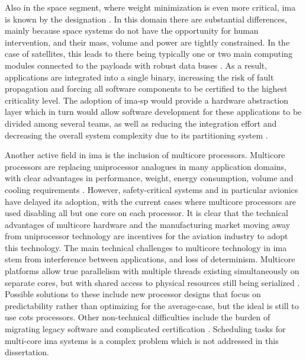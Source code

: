 \documentclass[main.tex]{subfiles}
\begin{document}
Also in the space segment, where weight minimization is even more critical, \gls{ima} is known by the designation .
In this domain there are substantial differences, mainly because space systems do not have the opportunity for human intervention, and their mass, volume and power are tightly constrained.
In the case of satellites, this leads to there being typically one or two main computing modules connected to the payloads with robust data buses \cite{silva2012integrated}.
As a result, applications are integrated into a single binary, increasing the risk of fault propagation and forcing all software components to be certified to the highest criticality level.
The adoption of \gls{ima-sp} would provide a hardware abstraction layer which in turn would allow software development for these applications to be divided among several teams, as well as reducing the integration effort and decreasing the overall system complexity due to its partitioning system \cite{windsor2011integrated}.

Another active field in \gls{ima} is the inclusion of multicore processors.
Multicore processors are replacing uniprocessor analogues in many application domains, with clear advantages in performance, weight, energy consumption, volume and cooling requirements \cite{melani2017scheduling}.
However, safety-critical systems and in particular avionics have delayed its adoption, with the current cases where multicore processors are used disabling all but one core on each processor. %
It is clear that the technical advantages of multicore hardware and the manufacturing market moving away from uniprocessor technology are incentives for the aviation industry to adopt this technology.
The main technical challenges to multicore technology in \gls{ima} stem from interference between applications, and loss of determinism. 
Multicore platforms allow true parallelism with multiple threads existing simultaneously on separate cores, but with shared access to physical resources still being serialized \cite{silva2014multima}.
Possible solutions to these include new processor designs that focus on predictability rather than optimizing for the average-case, but the ideal is still to use \gls{cots} processors.
Other non-technical difficulties include the burden of migrating legacy software and complicated certification \cite{melani2017scheduling}.
Scheduling tasks for multi-core \gls{ima} systems is a complex problem which is not addressed in this dissertation.

\section{}
\label{sec:arinc}
\end{document}
